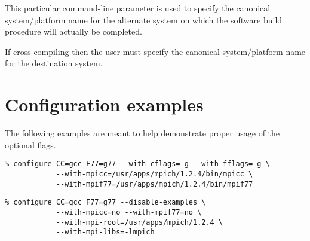 \begin{config}

\item {}

  This particular command-line parameter is used to specify the canonical system/platform name for the alternate 
  system on which the software build procedure will actually be completed.  

\item {}

  If cross-compiling then the user must specify the canonical system/platform name for the destination system.


\end{config}



\section{Configuration examples}

The following examples are meant to help demonstrate proper usage of the optional flags.

\begin{verbatim}
% configure CC=gcc F77=g77 --with-cflags=-g --with-fflags=-g \
            --with-mpicc=/usr/apps/mpich/1.2.4/bin/mpicc \ 
            --with-mpif77=/usr/apps/mpich/1.2.4/bin/mpif77
\end{verbatim}


\begin{verbatim}
% configure CC=gcc F77=g77 --disable-examples \
            --with-mpicc=no --with-mpif77=no \
            --with-mpi-root=/usr/apps/mpich/1.2.4 \
            --with-mpi-libs=-lmpich
\end{verbatim}